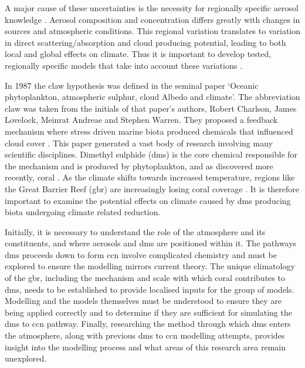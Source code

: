 A major cause of these uncertainties is the necessity for regionally specific aerosol knowledge \citep{intergovernmentalpanelonclimatechange:2015fa}. Aerosol composition and concentration differs greatly with changes in sources and atmospheric conditions. This regional variation translates to variation in direct scattering/absorption and cloud producing potential, leading to both local and global effects on climate. Thus it is important to develop tested, regionally specific models that take into account these variations \citep{cainey:2007jj, simpson:2014}. 

In 1987 the \gls{claw} hypothesis was defined in the seminal paper `Oceanic phytoplankton, atmospheric sulphur, cloud Albedo and climate'. The abbreviation \gls{claw} was taken from the initials of that paper's authors, Robert Charlson, James Lovelock, Meinrat Andreae and Stephen Warren. They proposed a feedback mechanism where stress driven marine biota produced chemicals that influenced cloud cover \citep{charlson:1987fw}. This paper generated a vast body of research involving many scientific disciplines. Dimethyl sulphide (\gls{dms}) is the core chemical responsible for the mechanism and is produced by phytoplankton, and as discovered more recently, coral \citep{raina:2013fj}. As the climate shifts towards increased temperature, regions like the Great Barrier Reef (\gls{gbr}) are increasingly losing coral coverage \citep{hoeghguldberg:1999bi}. It is therefore important to examine the potential effects on climate caused by \gls{dms} producing biota undergoing climate related reduction.

Initially, it is necessary to understand the role of the atmosphere and its constituents, and where aerosols and \gls{dms} are positioned within it. The pathways \gls{dms} proceeds down to form \gls{ccn} involve complicated chemistry \citep{barnes:2006ug} and must be explored to ensure the modelling mirrors current theory. The unique climatology of the \gls{gbr}, including the mechanism and scale with which coral contributes to \gls{dms}, needs to be established to provide localised inputs for the group of models. Modelling and the models themselves must be understood to ensure they are being applied correctly and to determine if they are sufficient for simulating the \gls{dms} to \gls{ccn} pathway. Finally, researching the method through which \gls{dms} enters the atmosphere, along with previous \gls{dms} to \gls{ccn} modelling attempts, provides insight into the modelling process and what areas of this research area remain unexplored.

